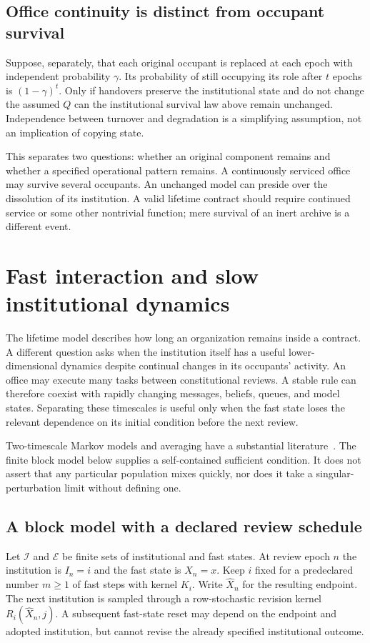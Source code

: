\documentclass[11pt,letterpaper]{article}
\theoremstyle{plain}
\theoremstyle{definition}
\theoremstyle{remark}
\begin{document}
\subsection{Office continuity is distinct from occupant survival}
Suppose, separately, that each original occupant is replaced at each epoch with independent probability $\gamma$. Its probability of still occupying its role after $t$ epochs is $(1-\gamma)^t$. Only if handovers preserve the institutional state and do not change the assumed $Q$ can the institutional survival law above remain unchanged. Independence between turnover and degradation is a simplifying assumption, not an implication of copying state.

This separates two questions: whether an original component remains and whether a specified operational pattern remains. A continuously serviced office may survive several occupants. An unchanged model can preside over the dissolution of its institution. A valid lifetime contract should require continued service or some other nontrivial function; mere survival of an inert archive is a different event.

\section{Fast interaction and slow institutional dynamics}\label{sec:multiscale}

The lifetime model describes how long an organization remains inside a contract. A different question asks when the institution itself has a useful lower-dimensional dynamics despite continual changes in its occupants' activity. An office may execute many tasks between constitutional reviews. A stable rule can therefore coexist with rapidly changing messages, beliefs, queues, and model states. Separating these timescales is useful only when the fast state loses the relevant dependence on its initial condition before the next review.

Two-timescale Markov models and averaging have a substantial literature~\cite{yinzhang}. The finite block model below supplies a self-contained sufficient condition. It does not assert that any particular population mixes quickly, nor does it take a singular-perturbation limit without defining one.

\subsection{A block model with a declared review schedule}
Let $\mathcal I$ and $\mathcal E$ be finite sets of institutional and fast states. At review epoch $n$ the institution is $I_n=i$ and the fast state is $X_n=x$. Keep $i$ fixed for a predeclared number $m\geq1$ of fast steps with kernel $K_i$. Write $\widehat X_n$ for the resulting endpoint. The next institution is sampled through a row-stochastic revision kernel $R_i(\widehat X_n,j)$. A subsequent fast-state reset may depend on the endpoint and adopted institution, but cannot revise the already specified institutional outcome.
\end{document}
